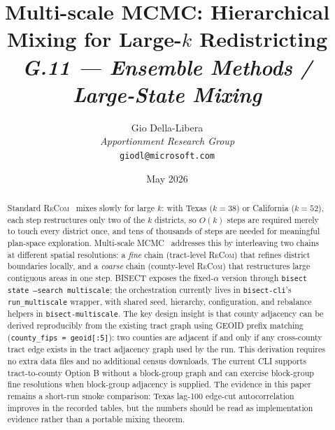 \documentclass[12pt]{article}
\title{%
  \textbf{Multi-scale MCMC: Hierarchical Mixing for Large-$k$ Redistricting}\\[0.8em]
  \normalsize\textit{G.11 --- Ensemble Methods / Large-State Mixing}%
}
\author{%
  Gio Della-Libera\\
  \textit{Apportionment Research Group}\\
  \small\texttt{giodl@microsoft.com}
}
\date{May 2026}
\newcommand{\recom}{\textsc{ReCom}}
\begin{document}
\maketitle

\begin{abstract}
\noindent
Standard \recom{}~\citep{deford2021} mixes slowly for large $k$: with
Texas ($k = 38$) or California ($k = 52$), each step restructures only two
of the $k$ districts, so $O(k)$ steps are required merely to touch every
district once, and tens of thousands of steps are needed for meaningful
plan-space exploration.
Multi-scale MCMC~\citep{autry2021} addresses this by interleaving two
chains at different spatial resolutions: a \emph{fine} chain (tract-level
\recom{}) that refines district boundaries locally, and a \emph{coarse}
chain (county-level \recom{}) that restructures large contiguous areas in
one step.
BISECT exposes the fixed-$\alpha$ version through
\texttt{bisect state --search multiscale}; the orchestration currently lives
in \texttt{bisect-cli}'s \texttt{run\_multiscale} wrapper, with shared seed,
hierarchy, configuration, and rebalance helpers in \texttt{bisect-multiscale}.
The key design insight is that county adjacency can be derived reproducibly from
the existing tract graph using GEOID prefix matching
(\texttt{county\_fips = geoid[:5]}): two counties are adjacent if and only
if any cross-county tract edge exists in the tract adjacency graph used by the
run.
This derivation requires no extra data files and no additional census
downloads.
The current CLI supports tract-to-county Option B without a block-group graph
and can exercise block-group fine resolutions when block-group adjacency is
supplied.
The evidence in this paper remains a short-run smoke comparison: Texas
lag-100 edge-cut autocorrelation improves in the recorded tables, but the
numbers should be read as implementation evidence rather than a portable
mixing theorem.
\end{abstract}

\tableofcontents
\newpage










\end{document}
